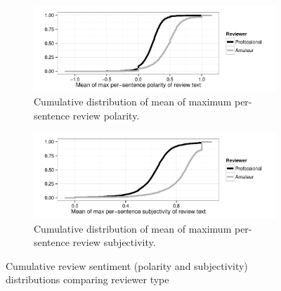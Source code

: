 \documentclass{sig-alternate}
\begin{document}
\begin{figure}[tb]
\centering

\begin{subfigure}[b]{\linewidth}
\includegraphics[width=\linewidth]{./console_games_polmaxmean_ecdf}
\caption{Cumulative distribution of mean of maximum per-sentence review polarity.}
\label{fig:revpol_max}
\end{subfigure}

\begin{subfigure}[b]{\linewidth}
\includegraphics[width=\linewidth]{./console_games_subjmaxmean_ecdf}
\caption{Cumulative distribution of mean of maximum per-sentence review subjectivity.}
\label{fig:revsubj_max}
\end{subfigure}
\caption{Cumulative review sentiment (polarity and subjectivity) distributions comparing reviewer type}
\label{fig:revsubj_density}
\end{figure}
\end{document}
